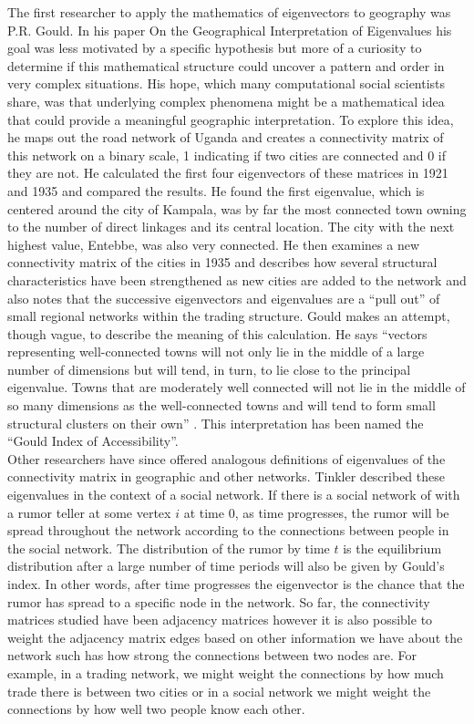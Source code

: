 \documentclass{article}
\theoremstyle{definition}
\theoremstyle{remark}
\begin{document}
The first researcher to apply the mathematics of eigenvectors to geography was P.R. Gould.  In his paper On the Geographical Interpretation of Eigenvalues his goal was less motivated by a specific hypothesis but more of a curiosity to determine if this mathematical structure could uncover a pattern and order in very complex situations.  His hope, which many computational social scientists share, was that underlying complex phenomena might be a mathematical idea that could provide a meaningful geographic interpretation.  To explore this idea, he maps out the road network of Uganda and creates a connectivity matrix of this network on a binary scale, 1 indicating if two cities are connected and 0 if they are not.  He calculated the first four eigenvectors of these matrices in 1921 and 1935 and compared the results.  He found the first eigenvalue, which is centered around the city of Kampala, was by far the most connected town owning to the number of direct linkages and its central location.  The city with the next highest value, Entebbe, was also very connected.  He then examines a new connectivity matrix of the cities in 1935 and describes how several structural characteristics have been strengthened as new cities are added to the network and also notes that the successive eigenvectors and eigenvalues are a “pull out” of small regional networks within the trading structure.  Gould makes an attempt, though vague, to describe the meaning of this calculation.  He says “vectors representing well-connected towns will not only lie in the middle of a large number of dimensions but will tend, in turn, to lie close to the principal eigenvalue.  Towns that are moderately well connected will not lie in the middle of so many dimensions as the well-connected towns and will tend to form small structural clusters on their own” .  This interpretation has been named the “Gould Index of Accessibility”.\\

Other researchers have since offered analogous definitions of eigenvalues of the connectivity matrix in geographic and other networks.  Tinkler described these eigenvalues in the context of a social network.  If there is a social network of with a rumor teller at some vertex $i$ at time 0, as time progresses, the rumor will be spread throughout the network according to the connections between people in the social network.  The distribution of the rumor by time $t$ is the equilibrium distribution after a large number of time periods will also be given by Gould’s index.   In other words, after time progresses the eigenvector is the chance that the rumor has spread to a specific node in the network.  So far, the connectivity matrices studied have been adjacency matrices however it is also possible to weight the adjacency matrix edges based on other information we have about the network such has how strong the connections between two nodes are.  For example, in a trading network, we might weight the connections by how much trade there is between two cities or in a social network we might weight the connections by how well two people know each other.\\
\end{document}
